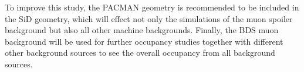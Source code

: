 To improve this study, the PACMAN geometry is recommended to be included in the SiD geometry, which will effect not only the simulations of the muon spoiler background but also all other machine backgrounds.
Finally, the BDS muon background will be used for further occupancy studies together with different other background sources to see the overall occupancy from all background sources.


